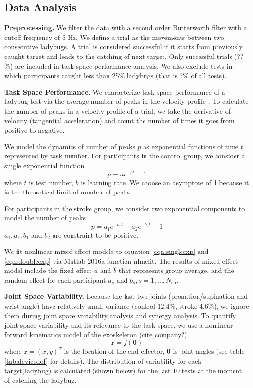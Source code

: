 \subsection{Data Analysis}

\textbf{Preprocessing.}
We filter the data with a second order Butterworth filter with a cutoff frequency of 5 Hz.
We define a trial as the movements between two consecutive ladybugs.
A trial is considered successful if it starts from previously caught target and leads to the catching of next target. Only successful trials (??\%) are included in task space performance analysis. We also exclude tests in which participants caught less than 25\% ladybugs (that is ?\% of all tests).

\textbf{Task Space Performance.}
We characterize task space performance of a ladybug test via the average number of peaks in the velocity profile \cite{}. 
To calculate the number of peaks in a velocity profile of a trial, we take the derivative of velocity (tangential acceleration) and count the number of times it goes from positive to negative.

We model the dynamics of number of peaks $ p $ as exponential functions of time $ t $ represented by task number.
For participants in the control group, we consider a single exponential function
\begin{equation}\label{eqn:singleexp}
p = a e^{-b t} + 1
\end{equation}
where $ t $ is test number, $ b $ is learning rate.
We choose an asymptote of 1 because it is the theoretical limit of number of peaks.

For participants in the stroke group, we consider two exponential components to model the number of peaks
\begin{equation}\label{eqn:doubleexp}
p = a_1 e^{-b_1 t} + a_2 e^{-b_2 t} + 1
\end{equation}
$ a_1, a_2, b_1 $ and $ b_2 $ are constraint to be positive.

We fit nonlinear mixed effect models \cite{} to equation \ref{eqn:singleexp} and \ref{eqn:doubleexp} via Matlab 2016a function \textsf{nlmefit}.
The results of mixed effect model include the fixed effect $ \hat{a} $ and $ \hat{b} $ that represents group average, and the random effect for each participant $ a_s $ and $ b_s, s = 1, ..., N_\text{sb} $.

\textbf{Joint Space Variability.}
Because the last two joints (pronation/supination and wrist angle) have relatively small variance (control 12.4\%, stroke 4.6\%), we ignore them during joint space variability analysis and synergy analysis.
To quantify joint space variability and its relevance to the task space, we use a nonlinear forward kinematics model of the exoskeleton (cite company?)
	\begin{equation}\label{eqn:nonlinearForwardKinematics}
	\bm{r} = f(\bm{\theta})
	\end{equation}
where $ \bm{r} = (x,y)^T $ is the location of the end effector, $ \bm{\theta} $ is joint angles (see table \ref{tab:devicedof} for details). 
The distribution of variability for each target(ladybug) is calculated (shown below) for the last 10 tests at the moment of catching the ladybug. 

